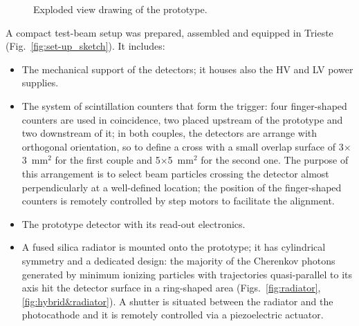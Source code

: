 \begin{enumerate}
\begin{figure}
\begin{center}
				\caption{\label{fig:espanso-ibrida}
                Exploded view drawing of the prototype.}
          		\end{center}
			\end{figure}
          \par     A compact test-beam setup was
	prepared, assembled and equipped in Trieste
(Fig.~\ref{fig:set-up_sketch}). It includes:
\begin{itemize}
\item The mechanical support of the detectors; it houses also the HV and LV
	power supplies.
    \item The system of scintillation counters that
    form the trigger: four finger-shaped counters
    are used in coincidence, two placed upstream of
    the prototype and two downstream of it; in both
    couples, the detectors are arrange with
    orthogonal orientation, so to define a cross
    with a small overlap surface of
    3$\times$3~mm$^2$ for the first couple and
    5$\times$5~mm$^2$ for the second one. The
    purpose of this arrangement is to 
    select beam particles crossing the detector
    almost perpendicularly at a well-defined
    location; the position of the finger-shaped counters is
    remotely controlled by step motors to facilitate
    the alignment.
\item The prototype detector with its read-out electronics.
\item A fused silica radiator is mounted onto
    the prototype; it has cylindrical symmetry
    and a dedicated design: the majority of the Cherenkov photons
    generated by minimum ionizing particles with trajectories quasi-parallel to its axis hit the detector surface in a ring-shaped area
    (Figs.~\ref{fig:radiator}, \ref{fig:hybrid&radiator}). A shutter is situated between the radiator and the photocathode and it is remotely controlled via a piezoelectric actuator.
  

\end{itemize}
\end{enumerate}
